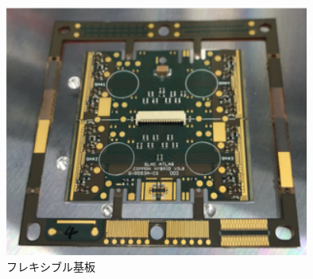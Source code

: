 \begin{figure}[bpt]\centering
\includegraphics[width=10cm]{pcb}
\caption[フレキシブル基板]{フレキシブル基板}
\label{pcb}
\end{figure}


